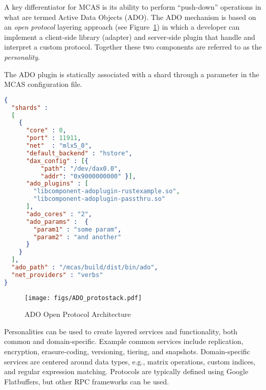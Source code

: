 \documentclass[letterpaper,twocolumn,10pt]{article}
\begin{document}
A key differentiator for MCAS is its ability to perform ``push-down''
operations in what are termed Active Data Objects (ADO).  The ADO
mechanism is based on an \textit{open protocol} layering approach (see
Figure~\ref{fig:adoopenproto}) in which a developer can implement a
client-side library (adapter) and server-side plugin that handle and interpret a
custom protocol.  Together these two components are referred to as the
\textit{personality}.

The ADO plugin is statically associated with a shard through a
parameter in the MCAS configuration file.

\begin{minipage}{\linewidth}
\begin{lstlisting}[language=json,
    caption={Example MCAS two-shard configuration},
    captionpos=b, label={lst:adoconf}]
{
  "shards" :
  [
    {
      "core" : 0,
      "port" : 11911,
      "net"  : "mlx5_0",
      "default_backend" : "hstore",
      "dax_config" : [{
          "path": "/dev/dax0.0",
          "addr": "0x9000000000" }],
      "ado_plugins" : [
        "libcomponent-adoplugin-rustexample.so",
        "libcomponent-adoplugin-passthru.so"
      ],
      "ado_cores" : "2",
      "ado_params" :  {
        "param1" : "some param",
        "param2" : "and another"
      }
    }
  ],
  "ado_path" : "/mcas/build/dist/bin/ado",
  "net_providers" : "verbs"
}
\end{lstlisting}
\end{minipage}

\begin{figure}
\centering
\texttt{[image: figs/ADO\_protostack.pdf]}
\caption{ADO Open Protocol Architecture}
\label{fig:adoopenproto}
\end{figure}

Personalities can be used to create layered services and
functionality, both common and domain-specific.  Example common
services include replication, encryption, erasure-coding, versioning,
tiering, and snapshots.  Domain-specific services are centered around
data types, e.g., matrix operations, custom indices, and regular
expression matching.  Protocols are typically defined using Google
Flatbuffers, but other RPC frameworks can be used.
\end{document}
